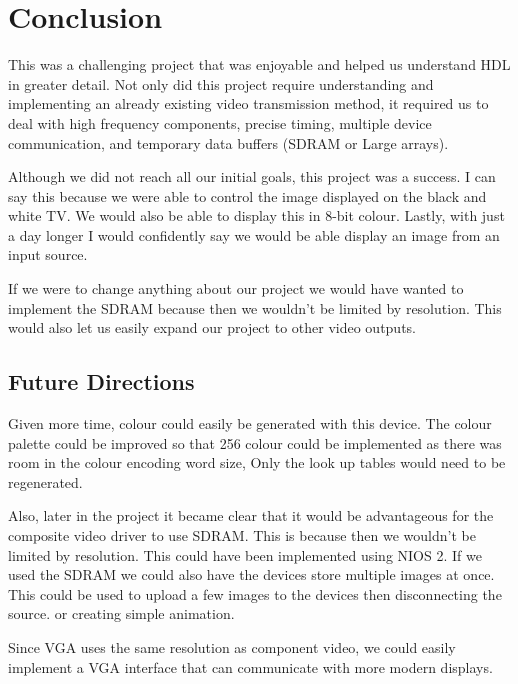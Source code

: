 \section{Conclusion}
This was a challenging project that was enjoyable and helped us understand HDL
in greater detail. Not only did this project require understanding and 
implementing an already existing video transmission method, it required us 
to deal with high frequency components, precise timing, multiple device 
communication, and temporary data buffers (SDRAM or Large arrays).

Although we did not reach all our initial goals, this project was a success. 
I can say this because we were able to control the image displayed on the black
and white TV. We would also be able to display this in 8-bit colour. Lastly, 
with just a day longer I would confidently say we would be able display an 
image from an input source.

If we were to change anything about our project we would have wanted to implement
the SDRAM because then we wouldn't be limited by resolution. This would also
let us easily expand our project to other video outputs.


\subsection{Future Directions}

Given more time, colour could easily be generated with this device. The colour
palette could be improved so that 256 colour could be implemented as there was
room in the colour encoding word size, Only the look up tables would need to be
regenerated. 

Also, later in the project it became clear that it would be advantageous for 
the composite video driver to use SDRAM. This is because then we wouldn't be 
limited by resolution. This could have been implemented using NIOS 2. If we 
used the SDRAM we could also have the devices store multiple images at once.
This could be used to upload a few images to the devices then disconnecting
the source. or creating simple animation. 

Since VGA uses the same resolution as component video, we could easily implement
a VGA interface that can communicate with more modern displays.

